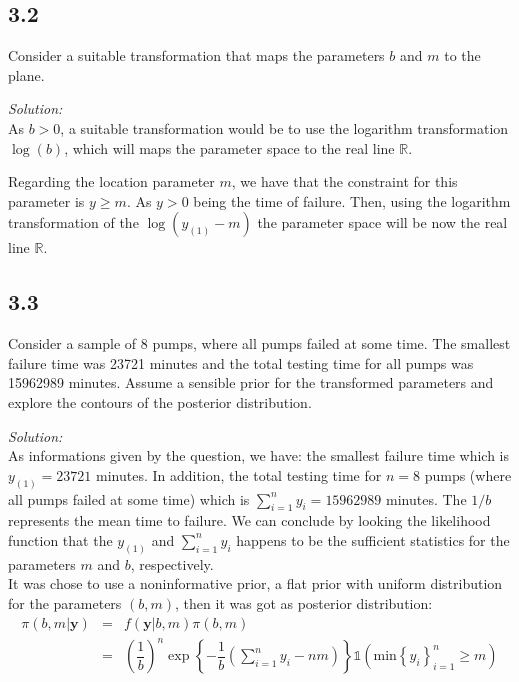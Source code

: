 \documentclass[a4paper, 11pt]{article}
\begin{document}
\subsection*{3.2} Consider a suitable transformation that maps the parameters $b$ and $m$ to the plane.

\noindent
\textit{Solution:} \\

As $b>0$, a suitable transformation would be to use the logarithm transformation $\log(b)$, which will maps the parameter space to the real line $\mathds{R}$.

Regarding the location parameter $m$, we have that the constraint for this parameter is $y\geq m$. As $y>0$ being the time of failure. Then, using the logarithm transformation of the $\log(y_{(1)} - m)$ the parameter space will be now the real line $\mathds{R}$.

\subsection*{3.3}
Consider a sample of 8 pumps, where all pumps failed at some time. The smallest failure time was 23721 minutes and the total testing time for all pumps was 15962989 minutes. Assume a sensible prior for the transformed parameters and explore the contours of the posterior distribution.

\noindent
\textit{Solution:}\\

As informations given by the question, we have: the smallest failure time which is $y_{(1)}=23721$ minutes. In addition, the total testing time for $n=8$ pumps (where all pumps failed at some time) which is $\sum_{i=1}^{n}y_i=15962989$ minutes. The $1/b$ represents the mean time to failure. We can conclude by looking the likelihood function that the $y_{(1)}$ and $\sum_{i=1}^{n}y_i$ happens to be the sufficient statistics for the parameters $m$ and $b$, respectively.\\

It was chose to use a noninformative prior, a flat prior with uniform distribution for the parameters $(b, m)$, then it was got as posterior distribution:
\begin{equation*}
\begin{array}{lclll}
\pi(b,m|\textbf{y}) & = & f(\textbf{y}|b,m)\pi(b,m) \\
& = & \left(\dfrac{1}{b}\right)^n \exp\left\{-\dfrac{1}{b}\left(\displaystyle\sum_{i=1}^{n}y_i - nm\right)\right\}  \mathds{1} \left(\mbox{min}\left\{ y_i \right\}^{n}_{i=1}\geq m\right)  \\
\end{array}
\end{equation*}
\end{document}
